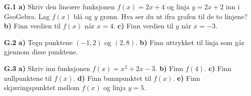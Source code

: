 \newpage
{}
\textbf{G.1}\bs
\textbf{a)} Skriv den lineære funksjonen $ {f(x)=2x+4} $ og linja $ {y=2x+2} $ inn i GeoGebra. Lag $ f(x) $ blå og $ y $ grønn. Hva ser du ut ifra grafen til de to linjene?\bs
\textbf{b)} Finn verdien til $ f(x) $ når $ {x=4} $.\bs
\textbf{c)} Finn verdien til $ y $ når $ {x=-3} $.\vsk

\textbf{G.2}\bs
\textbf{a)} Tegn punktene $ (-1,2) $ og $ (2,8) $.\bs
\textbf{b)} Finn uttrykket til linja som går gjennom disse punktene.\vsk

\textbf{G.3}\bs
\textbf{a)} Skriv inn funksjonen $ {f(x)=x^2+2x-3} $.\bs
\textbf{b)} Finn $ f(4) $.\bs
\textbf{c)} Finn nullpunktene til $ f(x) $.\bs
\textbf{d)} Finn bunnpunktet til $ f(x) $.\bs
\textbf{e)} Finn skjæringspunktet mellom $ f(x) $ og linja $ y=5 $.





